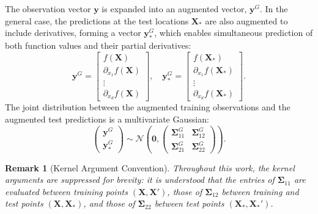 \documentclass[12pt]{article}
\newtheorem{remark}{Remark}
\begin{document}
The observation vector $\mathbf{y}$ is expanded into an augmented vector, $\mathbf{y}^{G}$. In the general case, the predictions at the test locations $\mathbf{X}_*$ are also augmented to include derivatives, forming a vector $\mathbf{y}^{G}_*$, which enables simultaneous prediction of both function values and their partial derivatives:
\begin{equation}
	\label{eqn:gek_aug_vectors}
	\mathbf{y}^{G} = \begin{bmatrix} f(\mathbf{X}) \\ \partial_{x_1} f(\mathbf{X}) \\ \vdots \\ \partial_{x_d} f(\mathbf{X}) \end{bmatrix}, \quad
	\mathbf{y}^{G}_* = \begin{bmatrix} f(\mathbf{X}_*) \\ \partial_{x_1} f(\mathbf{X}_*) \\ \vdots \\ \partial_{x_d} f(\mathbf{X}_*) \end{bmatrix}.
\end{equation}
The joint distribution between the augmented training observations and the augmented test predictions is a multivariate Gaussian:
\begin{equation}
	\label{eqn:full_gek_joint_dist}
	\begin{pmatrix}
		\mathbf{y}^{G} \\
		\mathbf{y}^{G}_*
	\end{pmatrix}
	\sim \mathcal{N}\left(
	\mathbf{0},
	\begin{pmatrix}
		\boldsymbol{\Sigma}^{G}_{11} & \boldsymbol{\Sigma}^{G}_{12} \\
		\boldsymbol{\Sigma}^{G}_{21} & \boldsymbol{\Sigma}^{G}_{22}
	\end{pmatrix}
	\right).
\end{equation}
\begin{remark}[Kernel Argument Convention]
	Throughout this work, the kernel arguments are suppressed for brevity: it is understood that the entries of $\boldsymbol{\Sigma}_{11}$ are evaluated between training points $(\mathbf{X}, \mathbf{X}')$, those of $\boldsymbol{\Sigma}_{12}$ between training and test points $(\mathbf{X}, \mathbf{X}_*)$, and those of $\boldsymbol{\Sigma}_{22}$ between test points $(\mathbf{X}_*, \mathbf{X}_*')$.
\end{remark}
\end{document}
